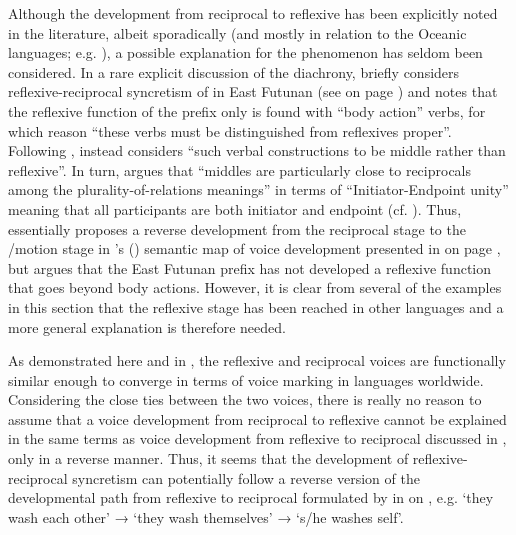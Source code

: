 Although the development from reciprocal to reflexive has been explicitly noted in the literature, albeit sporadically (and mostly in relation to the Oceanic languages; e.g. \citealt{moyse-faurie:2008, moyse-faurie:2017}), a possible explanation for the phenomenon has seldom been considered. In a rare explicit discussion of the diachrony, \cite[46f.]{lichtenberk:2000} briefly considers reflexive-reciprocal syncretism of  in East Futunan (see  on page \pageref{tab:ch7:recp-recp-oceanic}) and notes that the reflexive function of the prefix  only is found with “body action” verbs, for which reason “these verbs must be distinguished from reflexives proper”. Following \cite{kemmer:1993}, \cite[47]{lichtenberk:2000} instead considers “such verbal constructions to be middle rather than reflexive”. In turn, \cite[48]{lichtenberk:2000} argues that “middles are particularly close to reciprocals among the plurality-of-relations meanings” in terms of “Initiator-Endpoint unity” meaning that all participants are both initiator and endpoint (cf. \citealt[207ff.]{kemmer:1993}). Thus, \cite{lichtenberk:2000} essentially proposes a reverse development from the reciprocal stage to the /motion stage in \citeauthor{haspelmath:2003}’s (\citeyear{haspelmath:2003}) semantic map of voice development presented in  on page \pageref{fig:ch7:unidirectional}, but argues that the East Futunan prefix  has not developed a reflexive function that goes beyond body actions. However, it is clear from several of the examples in this section that the reflexive stage has been reached in other languages and a more general explanation is therefore needed.

As demonstrated here and in , the reflexive and reciprocal voices are functionally similar enough to converge in terms of voice marking in languages worldwide. Considering the close ties between the two voices, there is really no reason to assume that a voice development from reciprocal to reflexive cannot be explained in the same terms as voice development from reflexive to reciprocal discussed in , only in a reverse manner. Thus, it seems that the development of reflexive-reciprocal syncretism can potentially follow a reverse version of the developmental path from reflexive to reciprocal formulated by \cite{heine:miyashita:2008} in  on \pageref{fig:ch7:refl-recp}, e.g. ‘they wash each other’ → ‘they wash themselves’ → ‘s/he washes self’.

